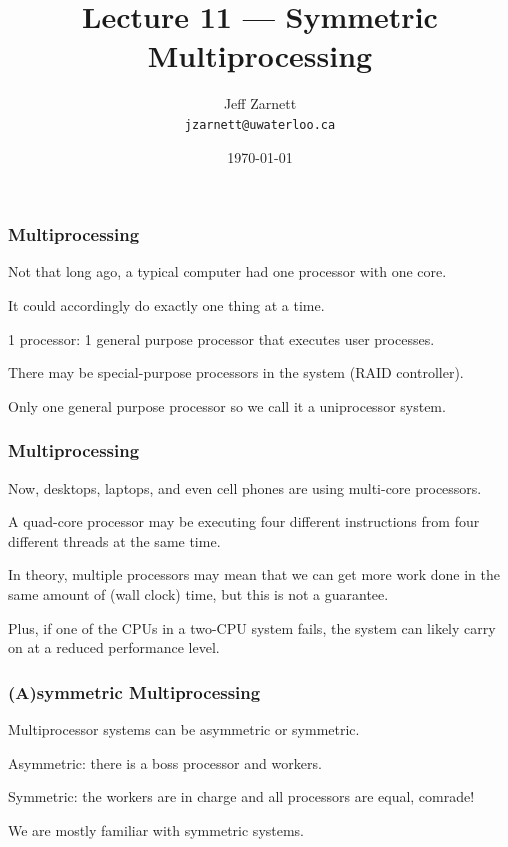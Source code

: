 

\title{Lecture 11 --- Symmetric Multiprocessing }

\author{Jeff Zarnett \\ \small \texttt{jzarnett@uwaterloo.ca}}
\date{\today}




\begin{frame}
  \titlepage

 \end{frame}

 
\begin{frame}
\frametitle{Multiprocessing}

Not that long ago, a typical computer had one processor with one core. 

It could accordingly do exactly one thing at a time. 

1 processor: 1 general purpose processor that executes user processes. 

There may be special-purpose processors in the system (RAID controller). 

Only one general purpose processor so we call it a uniprocessor system.



\end{frame}

 
\begin{frame}
\frametitle{Multiprocessing}

Now, desktops, laptops, and even cell phones are using multi-core processors.

A quad-core processor may be executing four different instructions from four different threads at the same time. 

In theory, multiple processors may mean that we can get more work done in the same amount of (wall clock) time, but this is not a guarantee. 

Plus, if one of the CPUs in a two-CPU system fails, the system can likely carry on at a reduced performance level.

\end{frame}

 
\begin{frame}
\frametitle{(A)symmetric Multiprocessing}

Multiprocessor systems can be \alert{asymmetric} or \alert{symmetric}.

Asymmetric: there is a \alert{boss} processor and \alert{workers}.

Symmetric: the workers are in charge and all processors are equal, comrade!

We are mostly familiar with symmetric systems.

\end{frame}

